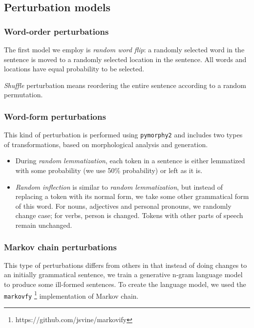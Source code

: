 \documentclass[11pt,a4paper]{article}
\begin{document}
\subsection{Perturbation models}

\begin{figure}
\end{figure}

\subsubsection{Word-order perturbations}

The first model we employ is \emph{random word flip}: a randomly selected word in the sentence is moved to a randomly selected location in the sentence.
All words and locations have equal probability to be selected.

\emph{Shuffle} perturbation means reordering the entire sentence according to a random permutation.

\subsubsection{Word-form perturbations}

This kind of perturbation is performed using \texttt{pymorphy2} \cite{pymorphy2} and includes two types of transformations, based on morphological analysis and generation.

\begin{itemize}
    \item During \emph{random lemmatization}, each token in a sentence is either lemmatized with some probability (we use 50\% probability) or left as it is.
    \item \emph{Random inflection} is similar to \emph{random lemmatization}, but instead of replacing a token with its normal form, we take some other grammatical form of this word. For nouns, adjectives and personal pronouns, we randomly change case; for verbs, person is changed. Tokens with other parts of speech remain unchanged.
\end{itemize}

\subsubsection{Markov chain perturbations}

This type of perturbations differs from others in that instead of doing changes to an initially grammatical sentence, we train a generative n-gram language model to produce some ill-formed sentences. To create the language model, we used the \texttt{markovfy} \footnote{https://github.com/jsvine/markovify} implementation of Markov chain.
\end{document}
